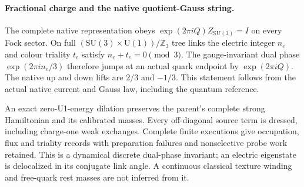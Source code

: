 \paragraph{Fractional charge and the native quotient-Gauss string.}
The complete native representation obeys
$\exp(2\pi iQ)Z_{\mathrm{SU}(3)}=I$ on every Fock sector. On full
$(\mathrm{SU}(3)\times\mathrm{U}(1))/\mathbb Z_3$ tree links the electric
integer $n_e$ and colour triality $t_e$ satisfy $n_e+t_e=0\pmod3$.
The gauge-invariant dual phase $\exp(2\pi i n_e/3)$ therefore jumps at
an actual quark endpoint by $\exp(2\pi iQ)$. The native up and down lifts
are $2/3$ and $-1/3$. This statement follows from the actual native current
and Gauss law, including the quantum reference.

An exact zero-U1-energy dilation preserves the parent's complete strong
Hamiltonian and its calibrated masses. Every off-diagonal source term is
dressed, including charge-one weak exchanges. Complete finite executions
give occupation, flux and triality records with preparation failures and
nonselective probe work retained. This is a dynamical discrete dual-phase
invariant; an electric eigenstate is delocalized in its conjugate link
angle. A continuous classical texture winding and free-quark rest masses
are not inferred from it.
